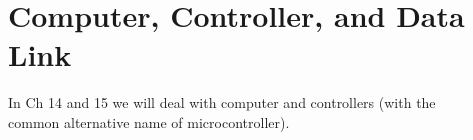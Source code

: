\newpage
{}
\section{Computer, Controller, and Data Link}

In Ch 14 and 15 we will deal with computer and controllers (with the\\ 
common alternative name of microcontroller).\\
